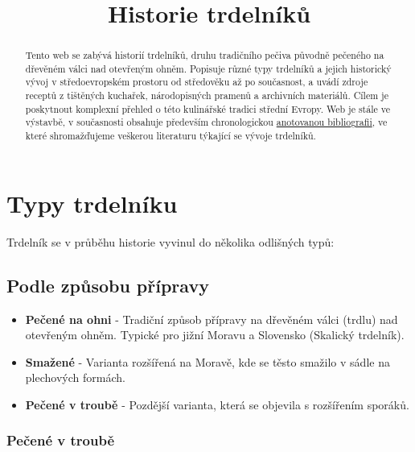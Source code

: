 \documentclass[a5paper,10pt]{book}
\title{Historie trdelníků}
\begin{document}
\shorthandoff{-}


\frontmatter
\maketitle
\ifdefined\HCode\else
\tableofcontents
\fi

\mainmatter

\begin{abstract}

Tento web se zabývá historií trdelníků, druhu tradičního pečiva původně pečeného na dřevěném válci nad otevřeným ohněm. Popisuje různé typy trdelníků a jejich historický vývoj v středoevropském prostoru od středověku až po současnost, a uvádí zdroje receptů z tištěných kuchařek, národopisných pramenů a archivních materiálů. Cílem je poskytnout komplexní přehled o této kulinářské tradici střední Evropy.
Web je stále ve výstavbě, v současnosti obsahuje především chronologickou \hyperref[chap:bibliografie]{anotovanou bibliografii}, ve které shromažďujeme veškerou literaturu týkající se vývoje trdelníků.
\end{abstract}





\chapter{Typy trdelníku}
Trdelník se v průběhu historie vyvinul do několika odlišných typů:

\section{Podle způsobu přípravy}
\begin{itemize}
\item \textbf{Pečené na ohni} - Tradiční způsob přípravy na dřevěném válci (trdlu) nad otevřeným ohněm. Typické pro jižní Moravu a Slovensko (Skalický trdelník).
\item \textbf{Smažené} - Varianta rozšířená na Moravě, kde se těsto smažilo v sádle na plechových formách.
\item \textbf{Pečené v troubě} - Pozdější varianta, která se objevila s rozšířením sporáků.
\end{itemize}

\subsection{Pečené v troubě}
\end{document}
